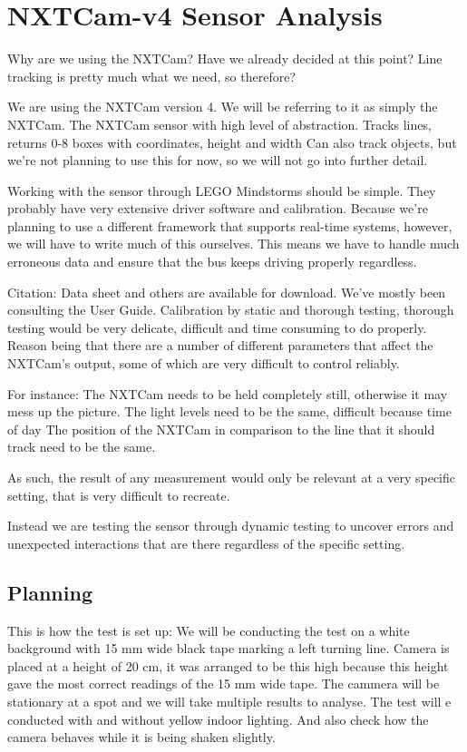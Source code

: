 \section{NXTCam-v4 Sensor Analysis}\label{CamAnalysis}

Why are we using the NXTCam? Have we already decided at this point?
Line tracking is pretty much what we need, so therefore?


We are using the NXTCam version 4. We will be referring to it as simply the NXTCam.
The NXTCam sensor with high level of abstraction.
Tracks lines, returns 0-8 boxes with coordinates, height and width 
Can also track objects, but we're not planning to use this for now, so we will not go into further detail. 

Working with the sensor through LEGO Mindstorms should be simple. They probably have very extensive driver software and calibration. Because we're planning to use a different framework that supports real-time systems, however, we will have to write much of this ourselves. This means we have to handle much erroneous data and ensure that the bus keeps driving properly regardless. 

Citation: \cite{nxtCamDocumentation}
Data sheet and others are available for download. We've mostly been consulting the User Guide. 
Calibration by static and thorough testing, thorough testing would be very delicate, difficult and time consuming to do properly. Reason being that there are a number of different parameters that affect the NXTCam's output, some of which are very difficult to control reliably. 

For instance:
The NXTCam needs to be held completely still, otherwise it may mess up the picture.
The light levels need to be the same, difficult because time of day
The position of the NXTCam in comparison to the line that it should track need to be the same.

As such, the result of any measurement would only be relevant at a very specific setting, that is very difficult to recreate. 

Instead we are testing the sensor through dynamic testing to uncover errors and unexpected interactions that are there regardless of the specific setting. 


\subsection{Planning}
This is how the test is set up:
We will be conducting the test on a white background with 15 mm wide black tape marking a left turning line. Camera is placed at a height of 20 cm, it was arranged to be this high because this height gave the most correct readings of the 15 mm wide tape. The cammera will be stationary at a spot and we will take multiple results to analyse. The test will e conducted with and without yellow indoor lighting. And also check how the camera behaves while it is being shaken slightly.

